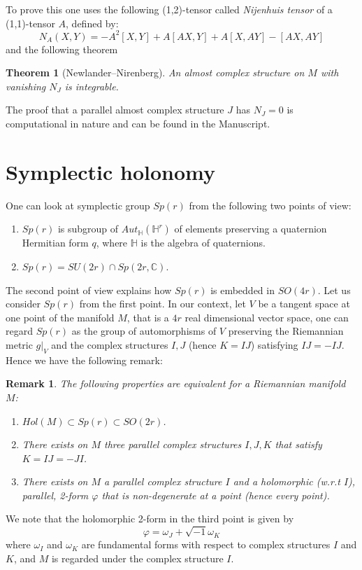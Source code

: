 \documentclass[11pt]{article}
\newtheorem{remark}{Remark}
\newtheorem{theorem}{Theorem}
\begin{document}
To prove this one uses the following (1,2)-tensor called \emph{Nijenhuis tensor} of a (1,1)-tensor \(A\), defined by:
\[
N_A(X,Y) = -A^2[X,Y] +A[AX, Y] + A[X, AY] - [AX, AY]
\]
and the following theorem
\begin{theorem}[Newlander–Nirenberg]
An almost complex structure on \(M\) with vanishing \(N_J\) is integrable.
\end{theorem}

The proof that a parallel almost complex structure \(J\) has \(N_J = 0\) is computational in
nature and can be found in the Manuscript.


\section{Symplectic holonomy}
\label{sec:orgb502420}
One can look at symplectic group \(Sp(r)\) from the following two points of view:
\begin{enumerate}
\item \(Sp(r)\) is subgroup of \(Aut_{\mathbb{H}}(\mathbb{H}^r)\) of elements preserving a quaternion
Hermitian form \(q\), where \(\mathbb{H}\) is the algebra of quaternions.
\item \(Sp(r) = SU(2r)\cap Sp(2r, \mathbb{C})\).
\end{enumerate}

The second point of view explains how \(Sp(r)\) is embedded in \(SO(4r)\). Let us consider \(Sp(r)\) from
the first point. In our context, let \(V\) be a tangent space at one point of the manifold \(M\), that
is a \(4r\) real dimensional vector space, one can regard \(Sp(r)\) as the group of automorphisms of \(V\)
preserving the Riemannian metric \(g|_V\) and the complex structures \(I,J\) (hence \(K=IJ\)) satisfying
\(IJ = -IJ\). Hence we have the following remark:

\begin{remark}
The following properties are equivalent for a Riemannian manifold \(M\):
\begin{enumerate}
\item \(Hol(M) \subset Sp(r)\subset SO(2r)\).
\item There exists on \(M\) three parallel complex structures \(I,J,K\) that satisfy \(K = IJ = -JI\).
\item There exists on \(M\) a parallel complex structure \(I\) and a holomorphic (w.r.t \(I\)), parallel,
2-form \(\varphi\) that is non-degenerate at a point (hence every point).
\end{enumerate}
\end{remark}
We note that the holomorphic 2-form in the third point is given by
\[
\varphi = \omega_J + \sqrt{-1}\omega_K
\]
where \(\omega_I\) and \(\omega_K\) are fundamental forms with respect to complex structures \(I\) and
\(K\), and \(M\) is regarded under the complex structure \(I\).
\end{document}
